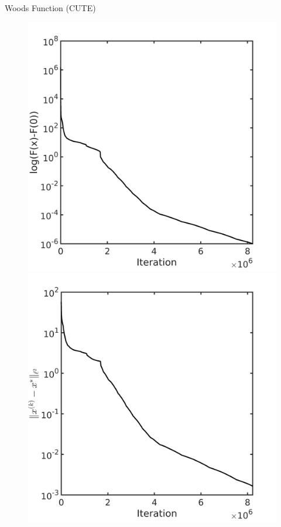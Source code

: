 \documentclass{beamer}
\begin{document}
\begin{frame}{Woods Function (CUTE)}
\begin{figure}[!htbp]
	  \includegraphics[scale=0.15]{./figures/woods320D.png}
	  \includegraphics[scale=0.15]{./figures/woods320D_dist.png}
\end{figure}
\end{frame}
\end{document}

